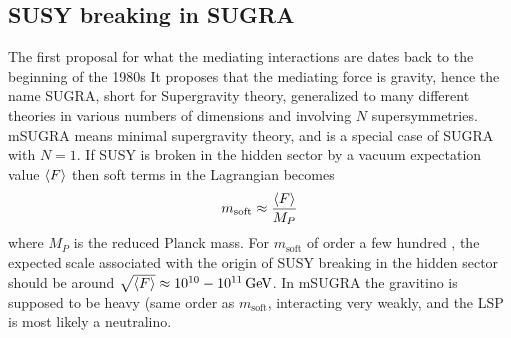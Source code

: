 \subsection*{SUSY breaking in SUGRA}
\noindent\justify
The first proposal for what the mediating interactions are dates back to the beginning of the 1980s \cite{Chamseddine:1982jx,Barbieri:1982eh,Ibanez:1982ee,Hall:1983iz,Ellis:1982wr}
It proposes that the mediating force is gravity, hence the name SUGRA, short for Supergravity theory, generalized to many different theories in various numbers of dimensions and involving $N$ supersymmetries. 
mSUGRA means minimal supergravity theory, and is a special case of SUGRA with $N=1$. 
If SUSY is broken in the hidden sector by a vacuum expectation value $\braket{F}$ then soft terms in the Lagrangian becomes
\begin{equation}
m_{\mathrm{soft}}\approx\frac{\braket{F}}{M_{P}}
\end{equation}
where $M_{P}$ is the reduced Planck mass. 
For $m_{\mathrm{soft}}$ of order a few hundred \GeV, the expected􏰛scale associated with the origin of SUSY breaking in the hidden sector should be around $\sqrt{\braket{F}}\approx10^{10}-10^{11}\,\text{Ge\hspace{-.08em}V}$.
In mSUGRA the gravitino is supposed to be heavy (same order as $m_{\mathrm{soft}}$, interacting very weakly, and the LSP is most likely a neutralino. 
